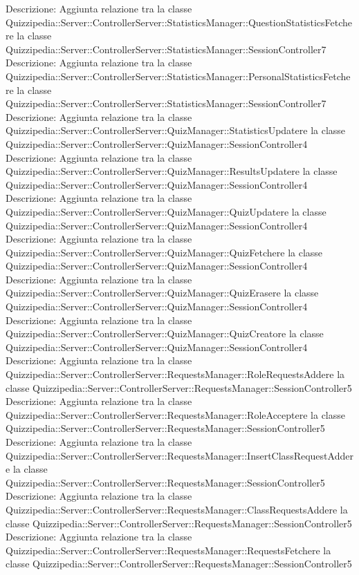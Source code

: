 Descrizione: Aggiunta relazione tra la classe Quizzipedia::Server::ControllerServer::StatisticsManager::QuestionStatisticsFetchere la classe Quizzipedia::Server::ControllerServer::StatisticsManager::SessionController7 
Descrizione: Aggiunta relazione tra la classe Quizzipedia::Server::ControllerServer::StatisticsManager::PersonalStatisticsFetchere la classe Quizzipedia::Server::ControllerServer::StatisticsManager::SessionController7 
Descrizione: Aggiunta relazione tra la classe Quizzipedia::Server::ControllerServer::QuizManager::StatisticsUpdatere la classe Quizzipedia::Server::ControllerServer::QuizManager::SessionController4 
Descrizione: Aggiunta relazione tra la classe Quizzipedia::Server::ControllerServer::QuizManager::ResultsUpdatere la classe Quizzipedia::Server::ControllerServer::QuizManager::SessionController4 
Descrizione: Aggiunta relazione tra la classe Quizzipedia::Server::ControllerServer::QuizManager::QuizUpdatere la classe Quizzipedia::Server::ControllerServer::QuizManager::SessionController4 
Descrizione: Aggiunta relazione tra la classe Quizzipedia::Server::ControllerServer::QuizManager::QuizFetchere la classe Quizzipedia::Server::ControllerServer::QuizManager::SessionController4 
Descrizione: Aggiunta relazione tra la classe Quizzipedia::Server::ControllerServer::QuizManager::QuizErasere la classe Quizzipedia::Server::ControllerServer::QuizManager::SessionController4 
Descrizione: Aggiunta relazione tra la classe Quizzipedia::Server::ControllerServer::QuizManager::QuizCreatore la classe Quizzipedia::Server::ControllerServer::QuizManager::SessionController4 
Descrizione: Aggiunta relazione tra la classe Quizzipedia::Server::ControllerServer::RequestsManager::RoleRequestsAddere la classe Quizzipedia::Server::ControllerServer::RequestsManager::SessionController5 
Descrizione: Aggiunta relazione tra la classe Quizzipedia::Server::ControllerServer::RequestsManager::RoleAcceptere la classe Quizzipedia::Server::ControllerServer::RequestsManager::SessionController5 
Descrizione: Aggiunta relazione tra la classe Quizzipedia::Server::ControllerServer::RequestsManager::InsertClassRequestAddere la classe Quizzipedia::Server::ControllerServer::RequestsManager::SessionController5 
Descrizione: Aggiunta relazione tra la classe Quizzipedia::Server::ControllerServer::RequestsManager::ClassRequestsAddere la classe Quizzipedia::Server::ControllerServer::RequestsManager::SessionController5 
Descrizione: Aggiunta relazione tra la classe Quizzipedia::Server::ControllerServer::RequestsManager::RequestsFetchere la classe Quizzipedia::Server::ControllerServer::RequestsManager::SessionController5 
